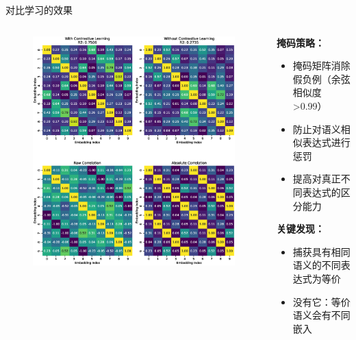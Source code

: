 \documentclass[aspectratio=1610]{beamer}
\begin{document}
    \begin{frame}{对比学习的效果}
        \begin{columns}
            \begin{column}{0.55\textwidth}
                \begin{figure}
                    \centering
                    \includegraphics[height=0.8\textheight]{figs/data_augmentation_heatmap.eps}
                \end{figure}
            \end{column}

            \begin{column}{0.45\textwidth}
                \textbf{掩码策略：}
                \begin{itemize}
                    \item 掩码矩阵消除假负例（余弦相似度>0.99）
                    \item 防止对语义相似表达式进行惩罚
                    \item 提高对真正不同表达式的区分能力
                \end{itemize}

                \textbf{关键发现：}
                \vspace{0.3cm}
                \begin{itemize}
                    \item 捕获具有相同语义的不同表达式为等价
                    \vspace{0.2cm}
                    \item 没有它：等价语义会有不同嵌入
                    \vspace{0.2cm}
                \end{itemize}
            \end{column}
        \end{columns}
    \end{frame}
\end{document}
